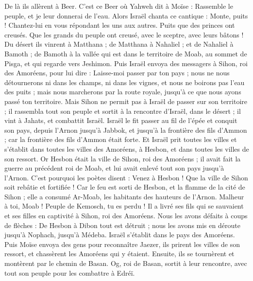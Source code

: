 \begin{multicols}{2}
De là ils allèrent à Beer. C'est ce Beer où Yahweh dit à Moïse : Rassemble le peuple, et je leur donnerai de l'eau.
Alors Israël chanta ce cantique : Monte, puits ! Chantez-lui en vous répondant les uns aux autres.
Puits que des princes ont creusés. Que les grands du peuple ont creusé, avec le sceptre, avec leurs bâtons ! Du désert ils vinrent à Matthana ;
de Matthana à Nahaliel ; et de Nahaliel à Bamoth ;
de Bamoth à la vallée qui est dans le territoire de Moab, au sommet de Pisga, et qui regarde vers Jeshimon.
Puis Israël envoya des messagers à Sihon, roi des Amoréens, pour lui dire :
Laisse-moi passer par ton pays ; nous ne nous détournerons ni dans les champs, ni dans les vignes, et nous ne boirons pas l'eau des puits ; mais nous marcherons par la route royale, jusqu'à ce que nous ayons passé ton territoire.
Mais Sihon ne permit pas à Israël de passer sur son territoire ; il rassembla tout son peuple et sortit à la rencontre d'Israël, dans le désert ; il vint à Jahats, et combattit Israël.
Israël le fit passer au fil de l'épée et conquit son pays, depuis l'Arnon jusqu'à Jabbok, et jusqu'à la frontière des fils d'Ammon ; car la frontière des fils d'Ammon était forte.
Et Israël prit toutes les villes et s'établit dans toutes les villes des Amoréens, à Hesbon, et dans toutes les villes de son ressort.
Or Hesbon était la ville de Sihon, roi des Amoréens ; il avait fait la guerre au précédent roi de Moab, et lui avait enlevé tout son pays jusqu'à l'Arnon.
C'est pourquoi les poètes disent : Venez à Hesbon ! Que la ville de Sihon soit rebâtie et fortifiée !
Car le feu est sorti de Hesbon, et la flamme de la cité de Sihon ; elle a consumé Ar-Moab, les habitants des hauteurs de l'Arnon.
Malheur à toi, Moab ! Peuple de Kemosch, tu es perdu ! Il a livré ses fils qui se sauvaient et ses filles en captivité à Sihon, roi des Amoréens.
Nous les avons défaits à coups de flèches : De Hesbon à Dibon tout est détruit ; nous les avons mis en déroute jusqu'à Nophach, jusqu'à Médeba.
Israël s'établit dans le pays des Amoréens.
Puis Moïse envoya des gens pour reconnaître Jaezer, ils prirent les villes de son ressort, et chassèrent les Amoréens qui y étaient.
Ensuite, ils se tournèrent et montèrent par le chemin de Basan. Og, roi de Basan, sortit à leur rencontre, avec tout son peuple pour les combattre à Edréï.

\end{multicols}
